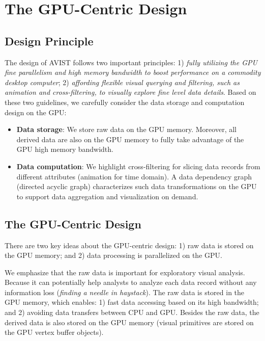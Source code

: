 \section{The GPU-Centric Design}
\subsection{Design Principle}
The design of AVIST follows two important principles: 1) \textit{fully utilizing the GPU  fine parallelism and high memory bandwidth to boost performance on a commodity desktop computer}; 2) \textit{affording flexible visual querying and filtering, such as animation and cross-filtering, to visually explore fine level data details}. Based on these two guidelines, we carefully consider the data storage and computation design on the GPU:
\begin{itemize}
\item  \textbf{Data storage}:  We store  raw data on the GPU memory. Moreover, all derived data are also on the GPU memory to fully take advantage of the GPU high memory bandwidth.


\item \textbf{Data computation}: We highlight cross-filtering  for slicing data records from different attributes (animation for time domain). A data dependency graph (directed acyclic graph) characterizes such data transformations on the GPU to support data aggregation and visualization on demand.

\end{itemize}

\subsection{The GPU-Centric Design}

There are two key ideas about the GPU-centric design: 1)  raw data is stored on the GPU memory; and 2) data processing is parallelized on the GPU.

We emphasize that the raw data is important for exploratory visual analysis. Because it can potentially help analysts to analyze each data record without any information loss (\textit{finding a needle in haystack}).  The raw data is stored in the GPU memory, which enables: 1) fast data accessing based on its high bandwidth; and 2) avoiding data transfers between CPU and GPU. Besides the raw data,  the derived data is also stored on the GPU memory (visual primitives are stored on the GPU vertex buffer objects). 

